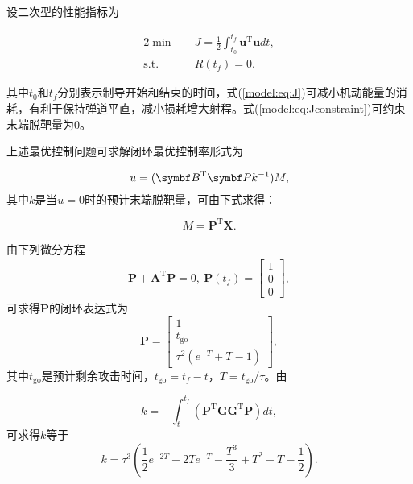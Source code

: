 设二次型的性能指标为

\begin{alignat}{2}
	\label{model:eq:J} \min \quad & J = \frac{1}{2}\int_{t_0}^{t_f} {\bm u}^{\mathrm T} {\bm u} dt,\\
	\mbox{s.t.} \quad 
	\label{model:eq:Jconstraint} & R(t_f)=0.
\end{alignat}

其中$t_0$和$t_f$分别表示制导开始和结束的时间，式(\ref{model:eq:J})可减小机动能量的消耗，有利于保持弹道平直，减小损耗增大射程。式(\ref{model:eq:Jconstraint})可约束末端脱靶量为0。

上述最优控制问题可求解闭环最优控制率形式为

\begin{equation}
\label{model:eq:closedU}
	u = ({\bm B}^{\text T}{\bm P}k^{-1})M,
\end{equation}
其中$k$是当$u=0$时的预计末端脱靶量，可由下式求得：

\begin{equation}
\label{model:eq:M}
	M={\bm P}^{\mathrm T}{\bm X}.
\end{equation}

由下列微分方程
\begin{align}
\label{model:eq:ricati}
	\dot{\bm P} + {\bm A}^{\mathrm T}{\bm P} = 0,\ {\bm P}(t_f)=\begin{bmatrix}
		1\\0\\0
	\end{bmatrix},
\end{align}
可求得$\bm P$的闭环表达式为
\begin{equation}
\label{model:eq:P}
	{\bm P} = \begin{bmatrix}
		1\\t_{\text{go}}\\\tau^2(e^{-T}+T-1)
	\end{bmatrix},
\end{equation}
其中$t_{\text{go}}$是预计剩余攻击时间，$t_{\text{go}}=t_f-t$，$T=t_{\text{go}}/\tau$。由

\begin{equation}
\label{model:eq:k}
	k = -\int_{t}^{t_f} ({\bm P}^{\mathrm T}{\bm G}{\bm G}^{\mathrm T}{\bm P}) dt,
\end{equation}
可求得$k$等于
\begin{equation}
\label{model:eq:ksolution}
	k = \tau^3(\frac{1}{2}e^{-2T} + 2Te^{-T} - \frac{T^3}{3} + T^2 - T - \frac{1}{2}).
\end{equation}

